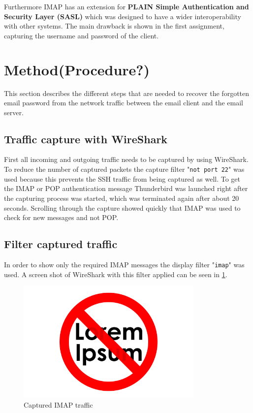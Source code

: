 \documentclass[parskip=full]{scrartcl}
\begin{document}
Furthermore IMAP has an extension for \textbf{PLAIN Simple Authentication and Security Layer (SASL)}\cite{zeilenga2006plain} which was designed to have a wider interoperability with other systems. The main drawback is shown in the first assignment, capturing the username and password of the client.

\section{Method(Procedure?)}
This section describes the different steps that are needed to recover the forgotten email password from the network traffic between the email client and the email server. 
\subsection{Traffic capture with WireShark}
First all incoming and outgoing traffic needs to be captured by using WireShark. To reduce the number of captured packets the capture filter "\verb|not port 22|" was used because this prevents the SSH traffic from being captured as well. To get the IMAP or POP authentication message Thunderbird was launched right after the capturing process was started, which was terminated again after about 20 seconds. Scrolling through the capture showed quickly that IMAP was used to check for new messages and not POP.
\subsection{Filter captured traffic}
In order to show only the required IMAP messages the display filter "\verb|imap|" was used. A screen shot of WireShark with this filter applied can be seen in \cref{fig:ws}. 

\begin{figure}[!ht]
	\centering %
	\includegraphics[height=6cm]{images/loremipsum.png} %
	\caption{Captured IMAP traffic} 
	\label{fig:ws} %
\end{figure} 
\end{document}
